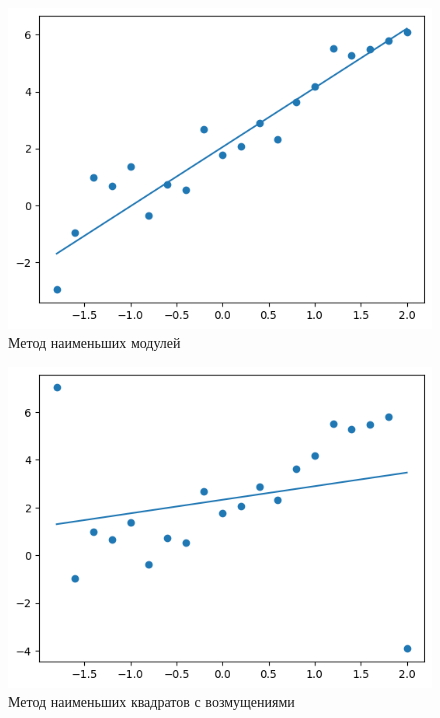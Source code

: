 \documentclass[12pt,a4paper]{article}
\begin{document}
	\begin{figure}[htbp!]
		\begin{center}
			\includegraphics[width = 1\linewidth]{graphics/lab6_abs}
			\caption{Метод наименьших модулей}
		\end{center}
	\end{figure}

	\begin{figure}[htbp!]
		\begin{center}
			\includegraphics[width = 1\linewidth]{graphics/lab6_sq_mod}
			\caption{Метод наименьших квадратов с возмущениями}
		\end{center}
	\end{figure}
\end{document}
